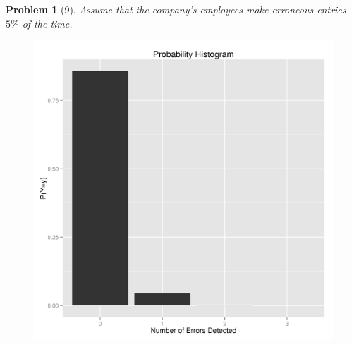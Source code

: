 \documentclass{article}
\theoremstyle{problem}
\newtheorem{prob}{Problem}
\begin{document}
\begin{prob}[9]
Assume that the company's employees make erroneous entries $5\%$ of the time.
    \begin{figure}[h!]
      \includegraphics[scale=.5]{hist_prob9.png}
    \end{figure}
\end{prob}
\end{document}
